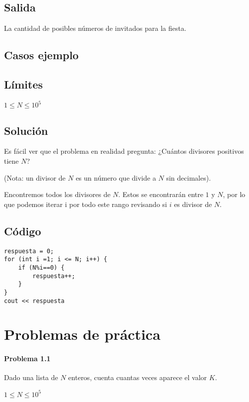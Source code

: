 \subsection*{Salida}
La cantidad de posibles números de invitados para la fiesta.
\subsection*{Casos ejemplo}
\begin{casebox2}
\end{casebox2}
\subsection*{Límites}
\begin{plimits}
	\item \(1\leq N \leq 10^5\)
\end{plimits}

\subsection*{Solución}
Es fácil ver que el problema en realidad pregunta: ¿Cuántos divisores positivos tiene \(N\)?

(Nota: un divisor de \(N\) es un número que divide a \(N\) sin decimales).

Encontremos todos los divisores de \(N\). Estos se encontrarán entre \(1\) y \(N\), por lo que podemos iterar i por todo este rango revisando si \(i\) es divisor de \(N\).
\subsection*{Código}
\begin{lstlisting}
respuesta = 0;
for (int i =1; i <= N; i++) {
	if (N%i==0) {
		respuesta++;
	}
}
cout << respuesta
\end{lstlisting}
\newpage
\section*{Problemas de práctica}
\paragraph{Problema 1.1} Dado una lista de \(N\) enteros, cuenta cuantas veces aparece el valor \(K\). 

\begin{plimits}
	\item \( 1\leq N\leq 10^5 \)
\end{plimits}

